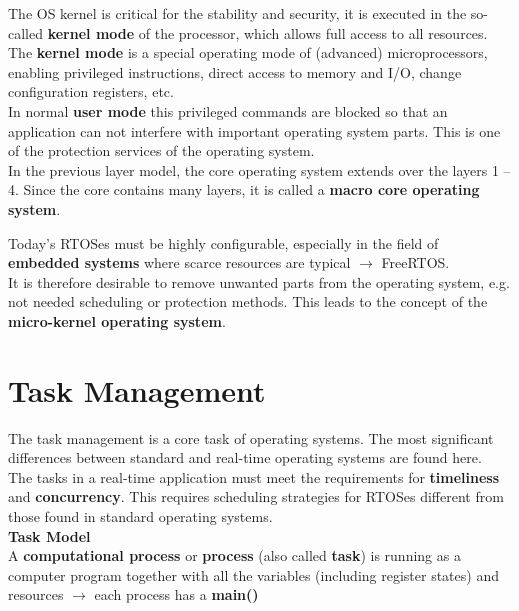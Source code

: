 The OS kernel is critical for the stability and security, it is executed in the so-called \textbf{kernel mode} of the processor, which allows full access to all resources.\\

The \textbf{kernel mode} is a special operating mode of (advanced) microprocessors, enabling privileged instructions, direct access to memory and I/O, change configuration registers, etc.\\

In normal \textbf{user mode} this privileged commands are blocked so that an application can not interfere with important operating system parts. This is one of the protection services of the operating system.\\

In the previous layer model, the core operating system extends over the layers 1 -- 4. Since the core contains many layers, it is called a \textbf{macro core operating system}.

Today's RTOSes must be highly configurable, especially in the field of \textbf{embedded systems} where scarce resources are typical  $\rightarrow$ FreeRTOS.\\

It is therefore desirable to remove unwanted parts from the operating system, e.g. not needed scheduling or protection methods. This leads to the concept of the \textbf{micro-kernel operating system}.

\section{Task Management}

The task management is a core task of operating systems. The most significant differences between standard and real-time operating systems are found here.\\

The tasks in a real-time application must meet the requirements for \textbf{timeliness} and \textbf{concurrency}. This requires scheduling strategies for RTOSes different from those found in  standard operating systems.\\

{\rot\bf Task Model}\\

A \textbf{computational process} or \textbf{process} (also called \textbf{task}) is running as a computer program together with all the variables (including register states) and resources  $\rightarrow$ each process has a \textbf{main()}\\

